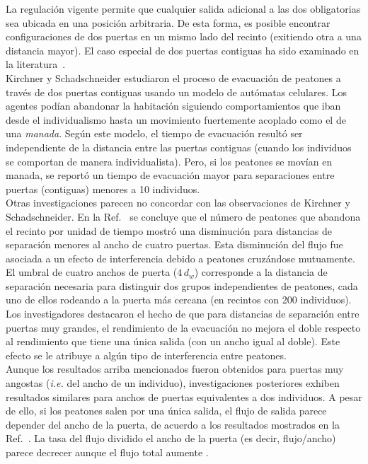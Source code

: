 \noindent La regulación vigente permite que cualquier salida adicional a las dos obligatorias sea ubicada en una posición arbitraria. De esta forma, es posible encontrar configuraciones de dos puertas en un mismo lado del recinto (exitiendo otra a una distancia mayor). El caso especial de dos puertas contiguas ha sido examinado en la literatura~\cite{kirchner1,perez1,daoliang1,huanhuan1}. \\

\noindent Kirchner y Schadschneider estudiaron el proceso de evacuación de peatones a través de dos puertas contiguas usando un modelo de autómatas celulares\cite{kirchner1}. Los agentes podían abandonar la habitación siguiendo comportamientos que iban desde el individualismo hasta un movimiento fuertemente acoplado como el de una \emph{manada}. Según este modelo, el tiempo de evacuación resultó ser independiente de la distancia entre las puertas contiguas (cuando los individuos se comportan de manera individualista). Pero, si los peatones se movían en manada, se reportó un tiempo de evacuación mayor   para separaciones entre puertas (contiguas) menores a 10 individuos.\\

\noindent Otras investigaciones parecen no concordar con las observaciones de Kirchner y Schadschneider. En la Ref.~\cite{perez1} se concluye que el número de peatones que abandona el recinto por unidad de tiempo mostró una disminución para distancias de separación menores al ancho de cuatro puertas. Esta disminución del flujo fue asociada a un efecto de interferencia debido a peatones cruzándose mutuamente. El umbral de cuatro anchos de puerta ($4\,d_w$) corresponde a la distancia de separación necesaria para distinguir dos  grupos independientes de peatones, cada uno de ellos rodeando a la puerta más cercana (en recintos con 200 individuos). \\

\noindent Los investigadores destacaron el hecho de que para distancias de separación entre puertas muy grandes, el rendimiento de la evacuación no mejora el doble respecto al rendimiento que tiene una única salida (con un ancho igual al doble). Este efecto se le atribuye a algún tipo de interferencia entre peatones\cite{perez1}.\\

\noindent Aunque los resultados arriba mencionados fueron obtenidos para puertas muy angostas (\emph{i.e.} del ancho de un individuo),
investigaciones posteriores exhiben resultados similares para anchos de puertas equivalentes a dos individuos. A pesar de ello, si los peatones salen por una única salida, el flujo de salida parece depender del ancho de la puerta, de acuerdo a los resultados mostrados en la Ref.~\cite{daoliang1}. La tasa del flujo dividido el ancho de la puerta (es decir, flujo/ancho) parece decrecer aunque el flujo total aumente \cite{daoliang1}.\\
 
